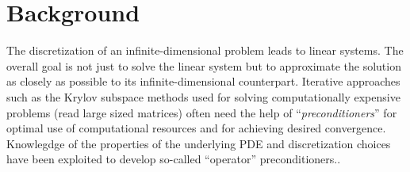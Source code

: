 \section{Background}
\label{sec:bg}
The discretization of an infinite-dimensional problem leads to linear systems. The overall goal is not just to solve the linear system but to approximate the solution as closely as possible to its infinite-dimensional counterpart. Iterative approaches such as the Krylov subspace methods\nocite{liesen2019nla1} used for solving computationally expensive problems (read large sized matrices) often need the help of ``\emph{preconditioners}'' for optimal use of computational resources and for achieving desired convergence. Knowlegdge of the properties of the underlying PDE and discretization choices have been exploited to develop so-called ``operator'' preconditioners.\cite{hiptmair2006operator}.

